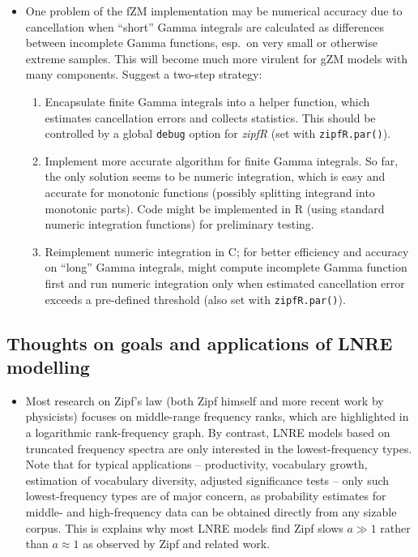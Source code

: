 \documentclass[a4paper]{article}
\begin{document}
\begin{itemize}
\item One problem of the fZM implementation may be numerical accuracy due to cancellation when ``short'' Gamma integrals are calculated as differences between incomplete Gamma functions, esp.\ on very small or otherwise extreme samples.  This will become much more virulent for gZM models with many components.  Suggest a two-step strategy:
  \begin{enumerate}
  \item Encapsulate finite Gamma integrals into a helper function, which estimates cancellation errors and collects statistics.  This should be controlled by a global \texttt{debug} option for \emph{zipfR} (set with \texttt{zipfR.par()}).
  \item Implement more accurate algorithm for finite Gamma integrals.  So far, the only solution seems to be numeric integration, which is easy and accurate for monotonic functions (possibly splitting integrand into monotonic parts).  Code might be implemented in R (using standard numeric integration functions) for preliminary testing.
  \item Reimplement numeric integration in C; for better efficiency and accuracy on ``long'' Gamma integrals, might compute incomplete Gamma function first and run numeric integration only when estimated cancellation error exceeds a pre-defined threshold (also set with \texttt{zipfR.par()}).
  \end{enumerate}

\end{itemize}


\subsection{Thoughts on goals and applications of LNRE modelling}
\label{sec:notes:goals-applications}

\begin{itemize}

\item Most research on Zipf's law (both Zipf himself and more recent work by physicists) focuses on middle-range frequency ranks, which are highlighted in a logarithmic rank-frequency graph.  By contrast, LNRE models \citep{Khmaladze:87,Baayen:01} based on truncated frequency spectra are only interested in the lowest-frequency types.  Note that for typical applications -- productivity, vocabulary growth, estimation of vocabulary diversity, adjusted significance tests -- only such lowest-frequency types are of major concern, as probability estimates for middle- and high-frequency data can be obtained directly from any sizable corpus.  This is explains why most LNRE models find Zipf slows $a \gg 1$ rather than $a\approx 1$ as observed by Zipf and related work.

\end{itemize}
\end{document}
